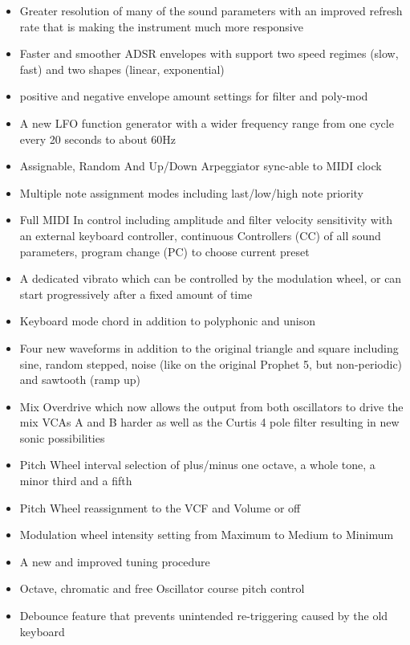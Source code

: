 \documentclass[landscape, 11pt, oneside]{report}
\newenvironment{flowtext}{\addmargin[0cm]{7cm}}{\endaddmargin} %
\begin{document}
\begin{flowtext}
\begin{itemize}
  \setlength\itemsep{0cm}
  \item Greater resolution of many of the sound parameters with an improved refresh rate that is making the instrument much more responsive
  \item Faster and smoother ADSR envelopes with support two speed regimes (slow, fast) and two shapes (linear, exponential)
  \item positive and negative envelope amount settings for filter and poly-mod
  \item A new LFO function generator with a wider frequency range from one cycle every 20 seconds to about 60Hz
  \item Assignable, Random And Up/Down Arpeggiator sync-able to MIDI clock
  \item Multiple note assignment modes including last/low/high note priority
  \item Full MIDI In control including amplitude and filter velocity sensitivity with an external keyboard controller, continuous Controllers (CC) of all sound parameters, program change (PC) to choose current preset
  \item A dedicated vibrato which can be controlled by the modulation wheel, or can start progressively after a fixed amount of time
  \item Keyboard mode chord in addition to polyphonic and unison  
  \item Four new waveforms in addition to the original triangle and square including sine, random stepped, noise (like on the original Prophet 5, but non-periodic) and sawtooth (ramp up)
  \item Mix Overdrive which now allows the output from both oscillators to drive the mix VCAs A and B harder as well as the Curtis 4 pole filter resulting in new sonic possibilities
  \item Pitch Wheel interval selection of plus/minus one octave, a whole tone, a minor third and a fifth
  \item Pitch Wheel reassignment to the VCF and Volume or off   
  \item Modulation wheel intensity setting from Maximum to Medium to Minimum
  \item A new and improved tuning procedure
  \item Octave, chromatic and free Oscillator course pitch control
  \item Debounce feature that prevents unintended re-triggering caused by the old keyboard
\end{itemize}


\end{flowtext}
\end{document}
